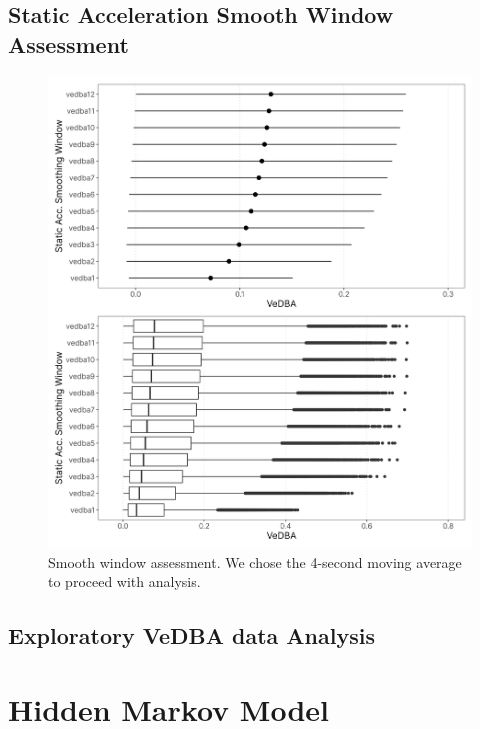 \documentclass[msc,numbers,hidelinks]{coppe}
\begin{document}
  \hypertarget{static-acceleration-smooth-window-assessment}{%
  \section{Static Acceleration Smooth Window Assessment}\label{static-acceleration-smooth-window-assessment}}
  \begin{figure}

  {\centering \includegraphics[width=1\linewidth]{../04_figures/appendix/plot_smoothing_window} 

  }

  \caption{Smooth window assessment. We chose the 4-second moving average to proceed with analysis.}\label{fig:appendix-smooth-window}
  \end{figure}
  \hypertarget{exploratory-vedba-data-analysis}{%
  \section{Exploratory VeDBA data Analysis}\label{exploratory-vedba-data-analysis}}

  \hypertarget{hidden-markov-model}{%
  \chapter{Hidden Markov Model}\label{hidden-markov-model}}
\end{document}
